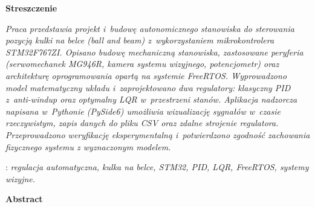 \documentclass[12pt, a4paper]{report} %
\begin{document}
\begin{titlepage}
    \newpage\thispagestyle{empty}
    \vspace*{2\baselineskip}
    \begin{center}
	{\large\bfseries Streszczenie}\par\bigskip
    \end{center}

    {\itshape
    Praca przedstawia projekt i~budowę autonomicznego stanowiska do sterowania
    pozycją kulki na belce (\textit{ball and beam}) z~wykorzystaniem mikrokontrolera
    STM32F767ZI.
    Opisano budowę mechaniczną stanowiska, zastosowane peryferia (serwomechanek
    MG946R, kamera systemu wizyjnego, potencjometr) oraz
    architekturę oprogramowania opartą na systemie FreeRTOS.
    Wyprowadzono model matematyczny układu i~zaprojektowano dwa regulatory:
    klasyczny PID z~anti-windup oraz optymalny LQR w~przestrzeni stanów.
    Aplikacja nadzorcza napisana w~Pythonie (PySide6) umożliwia wizualizację
    sygnałów w~czasie rzeczywistym, zapis danych do pliku CSV oraz zdalne
    strojenie regulatora.
    Przeprowadzono weryfikację eksperymentalną i~potwierdzono zgodność zachowania fizycznego
    systemu z wyznaczonym modelem.
    }
    \vspace*{1\baselineskip}

    : {\itshape regulacja automatyczna, kulka na belce,
    STM32, PID, LQR, FreeRTOS, systemy wizyjne.}
    \par
    \vspace{4\baselineskip}

    \begin{center}
	{\large\bfseries Abstract}\par\bigskip
    \end{center}
    
\end{titlepage}
\end{document}
